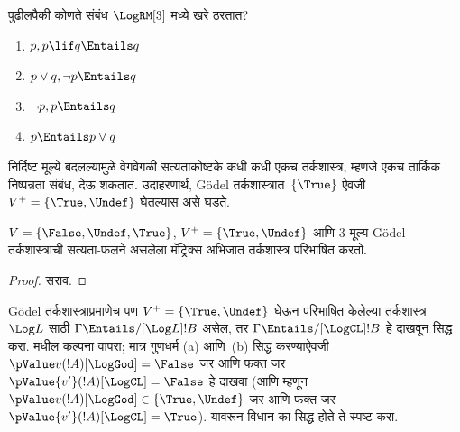 \documentclass[../../../include/open-logic-section]{subfiles}
\begin{document}
\begin{prob}
  पुढीलपैकी कोणते संबंध $\LogRM[3]$ मध्ये खरे ठरतात?
  \begin{enumerate}
    \item $p, p \lif q \Entails q$
    \item $p \lor q, \lnot p \Entails q$
    \item $\lnot p, p \Entails q$
    \item $p \Entails p \lor q$
  \end{enumerate}
\end{prob}

निर्दिष्ट मूल्ये बदलल्यामुळे वेगवेगळी सत्यताकोष्टके कधी कधी
एकच तर्कशास्त्र, म्हणजे एकच तार्किक निष्पन्नता संबंध, देऊ
शकतात. उदाहरणार्थ, G\"odel तर्कशास्त्रात~$\{\True\}$ ऐवजी
$V^+ = \{\True, \Undef\}$ घेतल्यास असे घडते.

\begin{prop}
  $V = \{\False, \Undef,\True\}$,
  $V^+=\{\True, \Undef\}$ आणि $3$-मूल्य G\"odel
  तर्कशास्त्राची सत्यता-फलने असलेला मॅट्रिक्स अभिजात
  तर्कशास्त्र परिभाषित करतो.
\end{prop}

\begin{proof}
  सराव.
\end{proof}

\begin{prob}
  G\"odel तर्कशास्त्राप्रमाणेच पण
  $V^+=\{\True,\Undef\}$ घेऊन परिभाषित केलेल्या
  तर्कशास्त्र~$\Log L$ साठी $\Gamma \Entails/[\Log L] !B$
  असेल, तर $\Gamma \Entails/[\LogCL] !B$ हे दाखवून
   सिद्ध करा.
   मधील कल्पना
  वापरा; मात्र गुणधर्म (a) आणि~(b) सिद्ध करण्याऐवजी
  $\pValue v(!A)[\LogGod] = \False$ जर आणि फक्त जर
  $\pValue {v'}(!A)[\LogCL] = \False$ हे दाखवा (आणि म्हणून
  $\pValue v(!A)[\LogGod] \in \{\True,\Undef\}$ जर आणि
  फक्त जर $\pValue {v'}(!A)[\LogCL] = \True$).
  यावरून विधान का सिद्ध होते ते स्पष्ट करा.
\end{prob}
\end{document}

